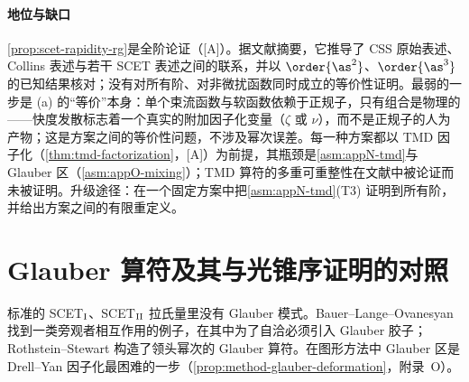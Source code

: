 \paragraph{地位与缺口}
\cref{prop:scet-rapidity-rg}是全阶论证（[A]）。据文献\cite{Collins:2017oxh}摘要，它推导了 CSS 原始表述、Collins 表述与若干 SCET 表述之间的联系，并以 $\order{\as^2}$、$\order{\as^3}$ 的已知结果核对；没有对所有阶、对非微扰函数同时成立的等价性证明。最弱的一步是 (a) 的“等价”本身：单个束流函数与软函数依赖于正规子，只有组合是物理的——快度发散标志着一个真实的附加因子化变量（$\zeta$ 或 $\nu$），而不是正规子的人为产物；这是方案之间的等价性问题，不涉及幂次误差。每一种方案都以 TMD 因子化（\cref{thm:tmd-factorization}，[A]）为前提，其瓶颈是\cref{asm:appN-tmd}与 Glauber 区（\cref{asm:appO-mixing}）；TMD 算符的多重可重整性在文献中被论证而未被证明\cite[第~13~章]{Collins2011}。升级途径：在一个固定方案中把\cref{asm:appN-tmd}(T3) 证明到所有阶，并给出方案之间的有限重定义。

\section{Glauber 算符及其与光锥序证明的对照}\label{sec:scet-glauber}

标准的 SCET$_{\rm I}$、SCET$_{\rm II}$ 拉氏量里没有 Glauber 模式。Bauer--Lange--Ovanesyan 找到一类旁观者相互作用的例子，在其中为了自洽必须引入 Glauber 胶子\cite{Bauer:2010cc}；Rothstein--Stewart 构造了领头幂次的 Glauber 算符\cite{RothsteinStewart2016}。在图形方法中 Glauber 区是 Drell--Yan 因子化最困难的一步（\cref{prop:method-glauber-deformation}，附录~O）。


